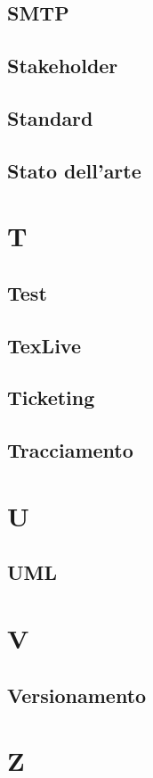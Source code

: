 \documentclass[12pt]{article}
\begin{document}
		\subsection{SMTP}
		\subsection{Stakeholder}
		\subsection{Standard}
		\subsection{Stato dell'arte}
	\clearpage
	\section{T}
		\subsection{Test}
		\subsection{TexLive}
		\subsection{Ticketing}
		\subsection{Tracciamento}
	\clearpage
	\section{U}
		\subsection{UML}
	\clearpage
	\section{V}
		\subsection{Versionamento}
	\clearpage
	\section{Z}	
\end{document}
